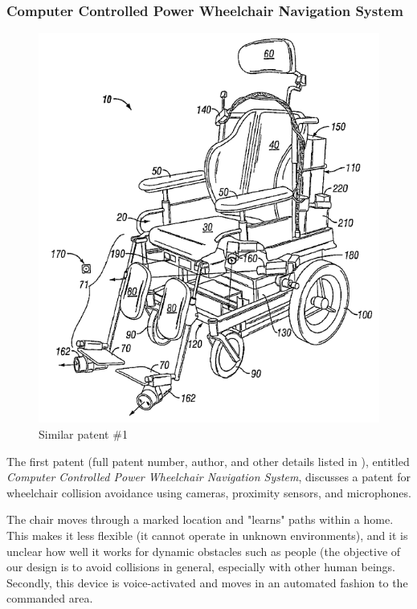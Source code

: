 \documentclass[oneside,final,a4paper]{report}
\begin{document}
\subsubsection{Computer Controlled Power Wheelchair Navigation System}
\begin{figure}[hbt]
 \centering
 \includegraphics[scale=0.15]{patents}
 \caption{Similar patent \#1 \cite{patent:computer_controlled}}
\end{figure}

The first patent (full patent number, author, and other details listed in \cite{patent:computer_controlled}), entitled \emph{Computer Controlled Power Wheelchair Navigation System}, discusses a patent for wheelchair collision avoidance using cameras, proximity sensors, and microphones.

The chair moves through a marked location and "learns" paths within a home. This makes it less flexible (it cannot operate in unknown environments), and it is unclear how well it works for dynamic obstacles such as people (the objective of our design is to avoid collisions in general, especially with other human beings. Secondly, this device is voice-activated and moves in an automated fashion to the commanded area.
\end{document}
